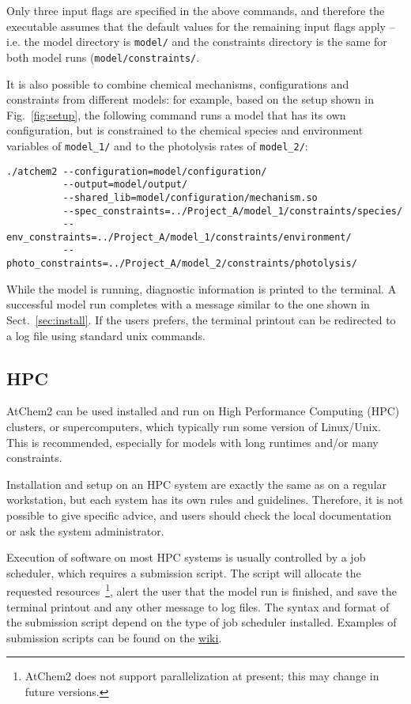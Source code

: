 Only three input flags are specified in the above commands, and
therefore the executable assumes that the default values for the
remaining input flags apply -- i.e. the model directory is
\texttt{model/} and the constraints directory is the same for both
model runs (\texttt{model/constraints/}.

It is also possible to combine chemical mechanisms, configurations and
constraints from different models: for example, based on the setup
shown in Fig.~\ref{fig:setup}, the following command runs a model that
has its own configuration, but is constrained to the chemical species
and environment variables of \texttt{model\_1/} and to the photolysis
rates of \texttt{model\_2/}:

\begin{verbatim}
./atchem2 --configuration=model/configuration/
          --output=model/output/
          --shared_lib=model/configuration/mechanism.so
          --spec_constraints=../Project_A/model_1/constraints/species/
          --env_constraints=../Project_A/model_1/constraints/environment/
          --photo_constraints=../Project_A/model_2/constraints/photolysis/
\end{verbatim}

While the model is running, diagnostic information is printed to the
terminal. A successful model run completes with a message similar to
the one shown in Sect.~\ref{sec:install}. If the users prefers, the
terminal printout can be redirected to a log file using standard unix
commands.

\subsection{HPC} \label{subsec:hpc}

AtChem2 can be used installed and run on High Performance Computing
(HPC) clusters, or supercomputers, which typically run some version of
Linux/Unix. This is recommended, especially for models with long
runtimes and/or many constraints.

Installation and setup on an HPC system are exactly the same as on a
regular workstation, but each system has its own rules and
guidelines. Therefore, it is not possible to give specific advice, and
users should check the local documentation or ask the system
administrator.

Execution of software on most HPC systems is usually controlled by a
job scheduler, which requires a submission script. The script will
allocate the requested resources~\footnote{AtChem2 does not support
  parallelization at present; this may change in future versions.},
alert the user that the model run is finished, and save the terminal
printout and any other message to log files. The syntax and format of
the submission script depend on the type of job scheduler
installed. Examples of submission scripts can be found on the
\href{https://github.com/AtChem/AtChem2/wiki/Running-on-HPC}{wiki}.

